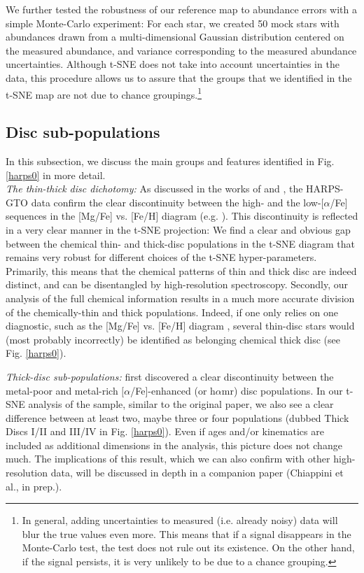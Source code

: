 \documentclass{aa}  %
\begin{document}
We further tested the robustness of our reference map to abundance errors with a simple Monte-Carlo experiment: For each star, we created 50 mock stars with abundances drawn from a multi-dimensional Gaussian distribution centered on the measured abundance, and variance corresponding to the measured abundance uncertainties. Although t-SNE does not take into account uncertainties in the data, this procedure allows us to assure that the groups that we identified in the t-SNE map are not due to chance groupings.\footnote{In general, adding uncertainties to measured (i.e. already noisy) data will blur the true values even more. This means that if a signal disappears in the Monte-Carlo test, the test does not rule out its existence. On the other hand, if the signal persists, it is very unlikely to be due to a chance grouping.} 

\subsection{Disc sub-populations}

In this subsection, we discuss the main groups and features identified in Fig. \ref{harps0} in more detail.\\

{\it The thin-thick disc dichotomy:} As discussed in the works of \citet{Adibekyan2011, Adibekyan2012} and \citet{DelgadoMena2017}, the HARPS-GTO data confirm the clear discontinuity between the high- and the low-[$\alpha$/Fe] sequences in the [Mg/Fe] vs. [Fe/H] diagram (e.g. \citealt{Edvardsson1993, Gratton1996, Fuhrmann1998, Fuhrmann2011, Fuhrmann2017}). This discontinuity is reflected in a very clear manner in the t-SNE projection:
We find a clear and obvious gap between the chemical thin- and thick-disc populations in the t-SNE diagram that remains very robust for different choices of the t-SNE hyper-parameters. Primarily, this means that the chemical patterns of thin and thick disc are indeed distinct, and can be disentangled by high-resolution spectroscopy. Secondly, our analysis of the full chemical information results in a much more accurate division of the chemically-thin and thick populations. Indeed, if one only relies on one diagnostic, such as the [Mg/Fe] vs. [Fe/H] diagram \citep{Adibekyan2011, DelgadoMena2017}, several thin-disc stars would (most probably incorrectly) be identified as belonging chemical thick disc (see Fig. \ref{harps0}).

{\it Thick-disc sub-populations:} \citet{Adibekyan2011} first discovered a clear discontinuity between the metal-poor and metal-rich $[\alpha$/Fe]-enhanced (or h$\alpha$mr) disc populations. In our t-SNE analysis of the \citet{DelgadoMena2017} sample, similar to the original paper, we also see a clear difference between at least two, maybe three or four populations (dubbed Thick Discs I/II and III/IV in Fig. \ref{harps0}). Even if ages and/or kinematics are included as additional dimensions in the analysis, this picture does not change much. The implications of this result, which we can also confirm with other high-resolution data, will be discussed in depth in a companion paper (Chiappini et al., in prep.).
\end{document}
